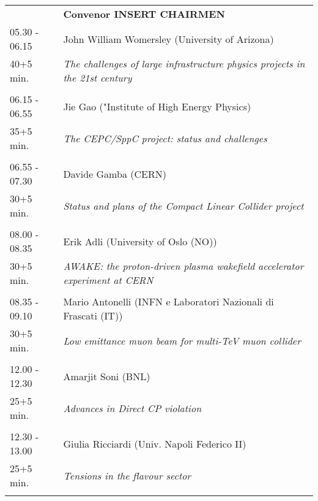\begin{longtable}{p{3cm}p{13cm}}
&\hfill {\bf Convenor INSERT CHAIRMEN }\\ 
05.30 - 06.15 & John William Womersley (University of Arizona)\\ 
40+5 min. & {\it The challenges of large infrastructure physics projects in the 21st century}\\ 
 & \\ 
06.15 - 06.55 & Jie Gao ("Institute of High Energy Physics)\\ 
35+5 min. & {\it The CEPC/SppC project: status and challenges}\\ 
 & \\ 
06.55 - 07.30 & Davide Gamba (CERN)\\ 
30+5 min. & {\it Status and plans of the Compact Linear Collider project}\\ 
 & \\ 
08.00 - 08.35 & Erik Adli (University of Oslo (NO))\\ 
30+5 min. & {\it AWAKE: the proton-driven plasma wakefield accelerator experiment at CERN}\\ 
 & \\ 
08.35 - 09.10 & Mario Antonelli (INFN e Laboratori Nazionali di  Frascati (IT))\\ 
30+5 min. & {\it Low emittance muon beam for multi-TeV muon collider}\\ 
 & \\ 
12.00 - 12.30 & Amarjit Soni (BNL)\\ 
25+5 min. & {\it Advances in Direct CP violation}\\ 
 & \\ 
12.30 - 13.00 & Giulia Ricciardi (Univ. Napoli Federico II)\\ 
25+5 min. & {\it Tensions in the flavour sector}\\ 
 & \\ 
\end{longtable}

